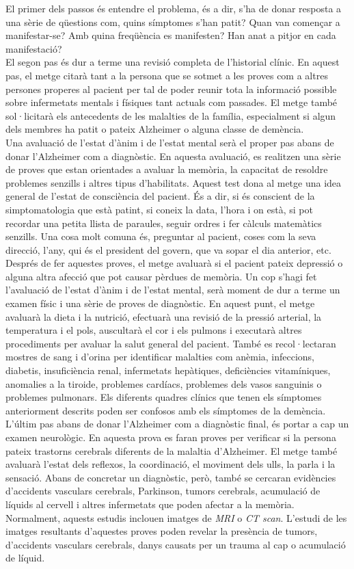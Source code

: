 \documentclass[a4paper,12pt]{article}
\begin{document}
El primer dels passos és entendre el problema, és a dir, s'ha de donar resposta a una sèrie de qüestions com, quins símptomes s'han patit? Quan van començar a manifestar-se? Amb quina freqüència es manifesten? Han anat a pitjor en cada manifestació?\\
El segon pas és dur a terme una revisió completa de l'historial clínic. En aquest pas, el metge citarà tant a la persona que se sotmet a les proves com a altres persones properes al pacient per tal de poder reunir tota la informació possible sobre infermetats mentals i físiques tant actuals com passades. El metge també sol·licitarà els antecedents de les malalties de la família, especialment si algun dels membres ha patit o pateix Alzheimer o alguna classe de demència.\\
Una avaluació de l'estat d'ànim i de l'estat mental serà el proper pas abans de donar l'Alzheimer com a diagnòstic. En aquesta avaluació, es realitzen una sèrie de proves que estan orientades a avaluar la memòria, la capacitat de resoldre problemes senzills i altres tipus d'habilitats. Aquest test dona al metge una idea general de l'estat de consciència del pacient. És a dir, si és conscient de la simptomatologia que està patint, si coneix la data, l'hora i on està, si pot recordar una petita llista de paraules, seguir ordres i fer càlculs matemàtics senzills. Una cosa molt comuna és, preguntar al pacient, coses com la seva direcció, l'any, qui és el president del govern, que va sopar el dia anterior, etc. Després de fer aquestes proves, el metge avaluarà si el pacient pateix depressió o alguna altra afecció que pot causar pèrdues de memòria. Un cop s'hagi fet l'avaluació de l'estat d'ànim i de l'estat mental, serà moment de dur a terme un examen físic i una sèrie de proves de diagnòstic. En aquest punt, el metge avaluarà la dieta i la nutrició, efectuarà una revisió de la pressió arterial, la temperatura i el pols, auscultarà el cor i els pulmons i executarà altres procediments per avaluar la salut general del pacient. També es recol·lectaran mostres de sang i d'orina per identificar malalties com anèmia, infeccions, diabetis, insuficiència renal, infermetats hepàtiques, deficiències vitamíniques, anomalies a la tiroide, problemes cardíacs, problemes dels vasos sanguinis o problemes pulmonars. Els diferents quadres clínics que tenen els símptomes anteriorment descrits poden ser confosos amb els símptomes de la demència.\\
L'últim pas abans de donar l'Alzheimer com a diagnòstic final, és portar a cap un examen neurològic. En aquesta prova es faran proves per verificar si la persona pateix trastorns cerebrals diferents de la malaltia d'Alzheimer. El metge també avaluarà l'estat dels reflexos, la coordinació, el moviment dels ulls, la parla i la sensació. Abans de concretar un diagnòstic, però, també se cercaran evidències d'accidents vasculars cerebrals, Parkinson, tumors cerebrals, acumulació de líquids al cervell i altres infermetats que poden afectar a la memòria. Normalment, aquests estudis inclouen imatges de \textit{MRI} o \textit{CT scan}. L'estudi de les imatges resultants d'aquestes proves poden revelar la presència de tumors, d'accidents vasculars cerebrals, danys causats per un trauma al cap o acumulació de líquid.
\end{document}
